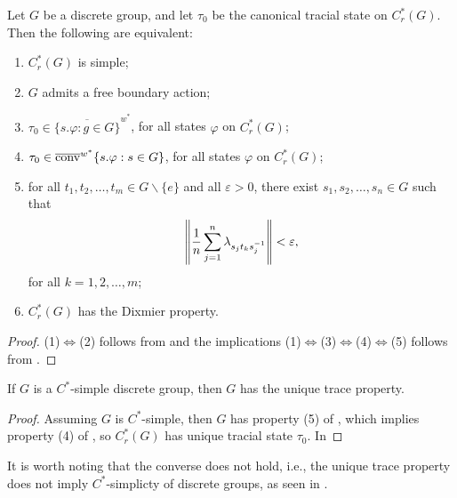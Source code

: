 \begin{theorem}\label{c*r simple 5}
Let $G$ be a discrete group, and let $\tau_0$ be the canonical tracial state on $C_r^*(G)$. Then the following are equivalent:
\begin{enumerate}
\item $C_r^*(G)$ is simple;
\item $G$ admits a free boundary action;
\item $\tau_0 \in \overline{\{ s. \varphi \colon g \in G \}}^{w^*}$, for all states $\varphi$ on $C_r^*(G)$;
\item $\tau_0 \in \overline{\operatorname{conv}}^{w^*} \{ s. \varphi : s \in G \}$, for all states $\varphi$ on $C_r^*(G)$;
\item for all $t_1,t_2,\dots,t_m \in G \backslash \{e \}$ and all $\varepsilon>0$, there exist $s_1,s_2,\dots,s_n \in G$ such that 
\begin{align*}
\left\lVert \frac{1}{n} \sum_{j=1}^n \lambda_{s_j t_k s_j^{-1}} \right\rVert <\varepsilon,
\end{align*}
for all $k=1,2,\dots,m$;
\item $C_r^*(G)$ has the Dixmier property.
\end{enumerate}
\begin{proof}
(1)$\Leftrightarrow$(2) follows from  and the implications (1)$\Leftrightarrow$(3)$\Leftrightarrow$(4)$\Leftrightarrow$(5) follows from .
\end{proof}
\end{theorem}

\begin{corollary}
If $G$ is a $C^*$-simple discrete group, then $G$ has the unique trace property.
\begin{proof}
Assuming $G$ is $C^*$-simple, then $G$ has property (5) of , which implies property (4) of , so $C_r^*(G)$ has unique tracial state $\tau_0$. In 
\end{proof}
\end{corollary}

It is worth noting that the converse does not hold, i.e., the unique trace property does not imply $C^*$-simplicty of discrete groups, as seen in \cite[Theorem A][2]{le2015c}.